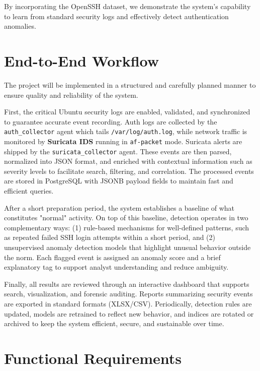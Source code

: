 \documentclass[12pt,a4paper]{report} %
\begin{document}
By incorporating the OpenSSH dataset, we demonstrate the system's capability to learn from standard security logs and effectively detect authentication anomalies.



\section{End-to-End Workflow}
The project will be implemented in a structured and carefully planned manner to ensure quality and reliability of the system. 

First, the critical Ubuntu security logs are enabled, validated, and synchronized to guarantee accurate event recording. Auth logs are collected by the \texttt{auth\_collector} agent which tails \texttt{/var/log/auth.log}, while network traffic is monitored by \textbf{Suricata IDS} running in \texttt{af-packet} mode. Suricata alerts are shipped by the \texttt{suricata\_collector} agent. These events are then parsed, normalized into JSON format, and enriched with contextual information such as severity levels to facilitate search, filtering, and correlation. The processed events are stored in PostgreSQL with JSONB payload fields to maintain fast and efficient queries.

After a short preparation period, the system establishes a baseline of what constitutes "normal" activity. On top of this baseline, detection operates in two complementary ways: (1) rule-based mechanisms for well-defined patterns, such as repeated failed SSH login attempts within a short period, and (2) unsupervised anomaly detection models that highlight unusual behavior outside the norm. Each flagged event is assigned an anomaly score and a brief explanatory tag to support analyst understanding and reduce ambiguity.

Finally, all results are reviewed through an interactive dashboard that supports search, visualization, and forensic auditing. Reports summarizing security events are exported in standard formats (XLSX/CSV). Periodically, detection rules are updated, models are retrained to reflect new behavior, and indices are rotated or archived to keep the system efficient, secure, and sustainable over time.

\section{Functional Requirements}
\end{document}
